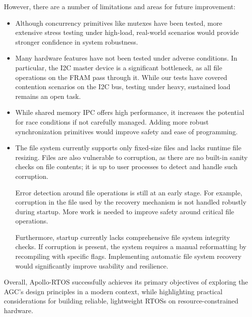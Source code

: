\ifsubmission\newpage\fi
However, there are a number of limitations and areas for future improvement:
\begin{itemize}
    \item Although concurrency primitives like mutexes have been tested, more extensive
        stress testing under high-load, real-world scenarios would provide stronger
        confidence in system robustness.

    \item Many hardware features have not been tested under adverse conditions. In
        particular, the I2C master device is a significant bottleneck, as all file
        operations on the FRAM pass through it. While our tests have covered contention
        scenarios on the I2C bus, testing under heavy, sustained load remains an open
        task.

    \item While shared memory IPC offers high performance, it increases the potential
        for race conditions if not carefully managed. Adding more robust
        synchronization primitives would improve safety and ease of programming.

    \item The file system currently supports only fixed-size files and lacks runtime
        file resizing. Files are also vulnerable to corruption, as there are no
        built-in sanity checks on file contents; it is up to user processes to detect
        and handle such corruption.

        Error detection around file operations is still at an early stage. For example,
        corruption in the file used by the recovery mechanism is not handled robustly
        during startup. More work is needed to improve safety around critical file
        operations.

        Furthermore, startup currently lacks comprehensive file system integrity
        checks. If corruption is present, the system requires a manual reformatting by
        recompiling with specific flags. Implementing automatic file system recovery
        would significantly improve usability and resilience.
\end{itemize}

Overall, Apollo-RTOS successfully achieves its primary objectives of exploring the
AGC's design principles in a modern context, while highlighting practical
considerations for building reliable, lightweight RTOSs on resource-constrained
hardware.

